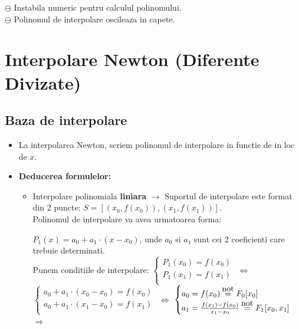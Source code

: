\documentclass{article}
\newcommand\eqnot{\stackrel{\mathclap{\normalfont\mbox{not}}}{=}}
\begin{document}
$\ominus$ Instabila numeric pentru calculul polinomului.\\

$\ominus$ Polinomul de interpolare oscileaza in capete.\\


\section{Interpolare Newton (Diferente Divizate)}
\label{sec:newton}

\subsection{Baza de interpolare}

\begin{itemize}
    \item La interpolarea Newton, scriem polinomul de interpolare in functie de  in loc de $x$.
    
    \item \textbf{Deducerea formulelor:}
    \begin{itemize}
        \item Interpolare polinomiala \textbf{liniara} $\rightarrow$ Suportul de interpolare este format din 2 puncte: $S=[(x_0, f(x_0)), (x_1, f(x_1))]$.\\
        Polinomul de interpolare va avea urmatoarea forma:
        
        $P_1(x) = a_0 + a_1 \cdot (x-x_0)$, unde $a_0$ si $a_1$ sunt cei 2 coeficienti care trebuie determinati.\\
        Punem conditiile de interpolare:
        $\begin{cases}
          P_1(x_0) = f(x_0)\\
          P_1(x_1) = f(x_1) \\
        \end{cases}$
        $\iff$\;
        $\begin{cases}
          a_0 + a_1 \cdot (x_0 - x_0) = f(x_0)\\
          a_0 + a_1 \cdot (x_1 - x_0) = f(x_1) \\
        \end{cases}$
        $\iff$\;
        $\begin{cases}
          a_0 = f(x_0) \;\eqnot\ F_0[x_0]\\
          a_1 = \frac{f(x_1) - f(x_0)}{x_1 - x_0}\;\eqnot\ F_1[x_0,x _1]\\
        \end{cases}$
        $\Longrightarrow$ \\
        

\end{itemize}
\end{itemize}
\end{document}
